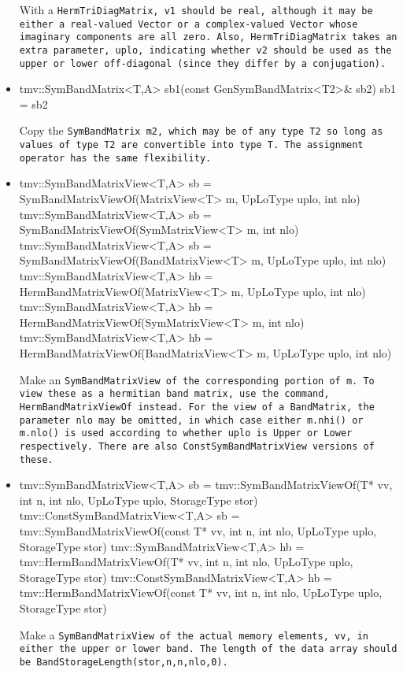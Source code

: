 \begin{itemize}
With a \tt{HermTriDiagMatrix}, \tt{v1} should be real, although
it may be either a real-valued \tt{Vector} or a complex-valued
\tt{Vector} whose imaginary components are all zero.
Also, \tt{HermTriDiagMatrix} takes an extra parameter, \tt{uplo}, indicating
whether \tt{v2} should be used as the upper or lower off-diagonal 
(since they differ by a conjugation).

\item
\begin{tmvcode}
tmv::SymBandMatrix<T,A> sb1(const GenSymBandMatrix<T2>& sb2)
sb1 = sb2
\end{tmvcode}
Copy the \tt{SymBandMatrix m2}, which may be of any type \tt{T2} so long
as values of type \tt{T2} are convertible into type \tt{T}.
The assignment operator has the same flexibility.

\item
\begin{tmvcode}
tmv::SymBandMatrixView<T,A> sb = 
      SymBandMatrixViewOf(MatrixView<T> m, UpLoType uplo, int nlo)
tmv::SymBandMatrixView<T,A> sb = 
      SymBandMatrixViewOf(SymMatrixView<T> m, int nlo)
tmv::SymBandMatrixView<T,A> sb = 
      SymBandMatrixViewOf(BandMatrixView<T> m, UpLoType uplo, int nlo)
tmv::SymBandMatrixView<T,A> hb = 
      HermBandMatrixViewOf(MatrixView<T> m, UpLoType uplo, int nlo)
tmv::SymBandMatrixView<T,A> hb = 
      HermBandMatrixViewOf(SymMatrixView<T> m, int nlo)
tmv::SymBandMatrixView<T,A> hb = 
      HermBandMatrixViewOf(BandMatrixView<T> m, UpLoType uplo, int nlo)
\end{tmvcode}
Make an \tt{SymBandMatrixView} of the corresponding portion of \tt{m}.  
To view these as a hermitian band matrix, use the command,
\tt{HermBandMatrixViewOf} instead.
For the view of a \tt{BandMatrix}, the parameter \tt{nlo} may be 
omitted, in which case either \tt{m.nhi()} or \tt{m.nlo()} is used 
according to whether \tt{uplo} is \tt{Upper} or \tt{Lower} respectively.
There are also \tt{ConstSymBandMatrixView} versions of these.

\item
\begin{tmvcode}
tmv::SymBandMatrixView<T,A> sb = 
      tmv::SymBandMatrixViewOf(T* vv, int n, int nlo, 
          UpLoType uplo, StorageType stor)
tmv::ConstSymBandMatrixView<T,A> sb = 
      tmv::SymBandMatrixViewOf(const T* vv, int n, int nlo, 
          UpLoType uplo, StorageType stor)
tmv::SymBandMatrixView<T,A> hb = 
      tmv::HermBandMatrixViewOf(T* vv, int n, int nlo, 
          UpLoType uplo, StorageType stor)
tmv::ConstSymBandMatrixView<T,A> hb = 
      tmv::HermBandMatrixViewOf(const T* vv, int n, int nlo, 
          UpLoType uplo, StorageType stor)
\end{tmvcode}
Make a \tt{SymBandMatrixView} of the actual memory elements, \tt{vv}, in either the
upper or lower band. 
The length of the data array should be 
\tt{BandStorageLength(stor,n,n,nlo,0)}.


\end{itemize}

